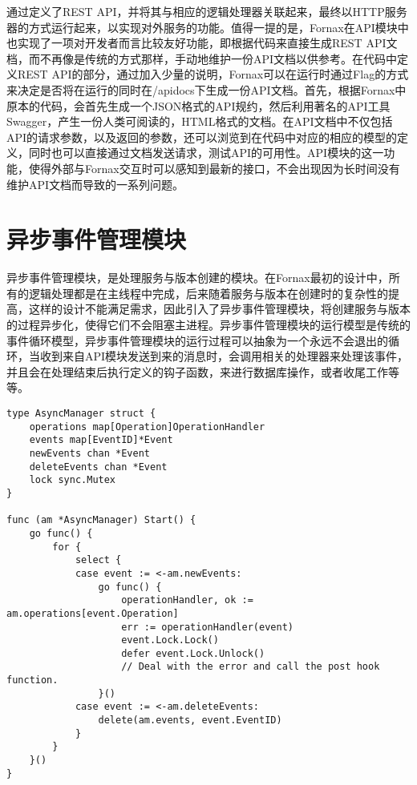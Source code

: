 通过定义了REST API，并将其与相应的逻辑处理器关联起来，最终以HTTP服务器的方式运行起来，以实现对外服务的功能。值得一提的是，Fornax在API模块中也实现了一项对开发者而言比较友好功能，即根据代码来直接生成REST API文档，而不再像是传统的方式那样，手动地维护一份API文档以供参考。在代码中定义REST API的部分，通过加入少量的说明，Fornax可以在运行时通过Flag的方式来决定是否将在运行的同时在/apidocs下生成一份API文档。首先，根据Fornax中原本的代码，会首先生成一个JSON格式的API规约，然后利用著名的API工具Swagger，产生一份人类可阅读的，HTML格式的文档。在API文档中不仅包括API的请求参数，以及返回的参数，还可以浏览到在代码中对应的相应的模型的定义，同时也可以直接通过文档发送请求，测试API的可用性。API模块的这一功能，使得外部与Fornax交互时可以感知到最新的接口，不会出现因为长时间没有维护API文档而导致的一系列问题。

\section{异步事件管理模块}

异步事件管理模块，是处理服务与版本创建的模块。在Fornax最初的设计中，所有的逻辑处理都是在主线程中完成，后来随着服务与版本在创建时的复杂性的提高，这样的设计不能满足需求，因此引入了异步事件管理模块，将创建服务与版本的过程异步化，使得它们不会阻塞主进程。异步事件管理模块的运行模型是传统的事件循环模型，异步事件管理模块的运行过程可以抽象为一个永远不会退出的循环，当收到来自API模块发送到来的消息时，会调用相关的处理器来处理该事件，并且会在处理结束后执行定义的钩子函数，来进行数据库操作，或者收尾工作等等。

\begin{lstlisting}[caption={抽象后的异步事件管理器结构与实现}]
type AsyncManager struct {
	operations map[Operation]OperationHandler
	events map[EventID]*Event
	newEvents chan *Event
	deleteEvents chan *Event
	lock sync.Mutex
}

func (am *AsyncManager) Start() {
	go func() {
		for {
			select {
			case event := <-am.newEvents:
				go func() {
					operationHandler, ok := am.operations[event.Operation]
					err := operationHandler(event)
					event.Lock.Lock()
					defer event.Lock.Unlock()
					// Deal with the error and call the post hook function.
				}()
			case event := <-am.deleteEvents:
				delete(am.events, event.EventID)
			}
		}
	}()
}
\end{lstlisting}


